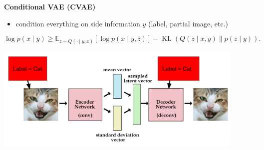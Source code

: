 \documentclass[portrait,fontscale=0.40,paperwidth=30in, paperheight=40in,margin=1in]{baposter} %
\theoremstyle{definition}
\theoremstyle{remark}
\newcommand{\op}[1]{\operatorname{#1}}
\newcommand{\E}{\mathbb{E}}
\newcommand{\compresslist}{ %
\setlength{\itemsep}{1pt}
\setlength{\parskip}{0pt}
\setlength{\parsep}{0pt}
}
\begin{document}
\begin{poster}
{\textbf{Conditional VAE (CVAE)}
\begin{itemize}\compresslist
\item condition everything on side information $y$ (label, partial image, etc.)
\end{itemize}
\begin{scriptsize}
\begin{equation}
\log p(x \mid y)
\ge \E_{z \sim Q(\cdot \mid y,x)}[\log p(x \mid y,z)]
- \op{KL}(Q(z \mid x,y) \| p(z \mid y)).
\end{equation}
\end{scriptsize}

\begin{minipage}[b]{\textwidth}
\center
\includegraphics[width=0.9\textwidth]{images/cvae_simple.png}
\centering
\end{minipage}


}



\end{poster}
\end{document}

